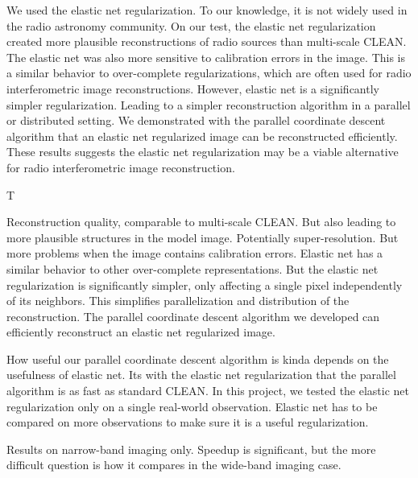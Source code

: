 
We used the elastic net regularization. To our knowledge, it is not widely used in the radio astronomy community. On our test, the elastic net regularization created more plausible reconstructions of radio sources than multi-scale CLEAN. The elastic net was also more sensitive to calibration errors in the image. This is a similar behavior to over-complete regularizations, which are often used for radio interferometric image reconstructions. However, elastic net is a significantly simpler regularization. Leading to a simpler reconstruction algorithm in a parallel or distributed setting. We demonstrated with the parallel coordinate descent algorithm that an elastic net regularized image can be reconstructed efficiently. These results suggests the elastic net regularization may be a viable alternative for radio interferometric image reconstruction.



T

  Reconstruction quality, comparable to multi-scale CLEAN. But also leading to more plausible structures in the model image. 
Potentially super-resolution.
But more problems when the image contains calibration errors.
Elastic net has a similar behavior to other over-complete representations. But the elastic net regularization is significantly simpler, only affecting a single pixel independently of its neighbors. This simplifies parallelization and distribution of the reconstruction. 
The parallel coordinate descent algorithm we developed can efficiently reconstruct an elastic net regularized image.

How useful our parallel coordinate descent algorithm is kinda depends on the usefulness of elastic net. Its with the elastic net regularization that the parallel algorithm is as fast as standard CLEAN. In this project, we tested the elastic net regularization only on a single real-world observation.
Elastic net has to be compared on more observations to make sure it is a useful regularization.


Results on narrow-band imaging only. Speedup is significant, but the more difficult question is how it compares in the wide-band imaging case.


 

